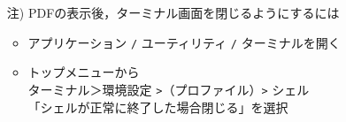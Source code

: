 \documentclass{ujarticle}
\begin{document}
\begin{enumerate}[\bf\large 1.]
\begin{enumerate}[(1)]
\begin{itemize}
     \item[注)]PDFの表示後，ターミナル画面を閉じるようにするには
       \begin{itemize}
        \item アプリケーション \verb|/| ユーティリティ \verb|/| ターミナルを開く
        \item トップメニューから\\
          \hspace*{5mm}ターミナル＞環境設定 \verb|>|（プロファイル）\verb|>| シェル\\
          \hspace*{10mm}「シェルが正常に終了した場合閉じる」を選択
        \end{itemize}
     \end{itemize} 
  \end{enumerate}


\end{enumerate}
\end{document}
